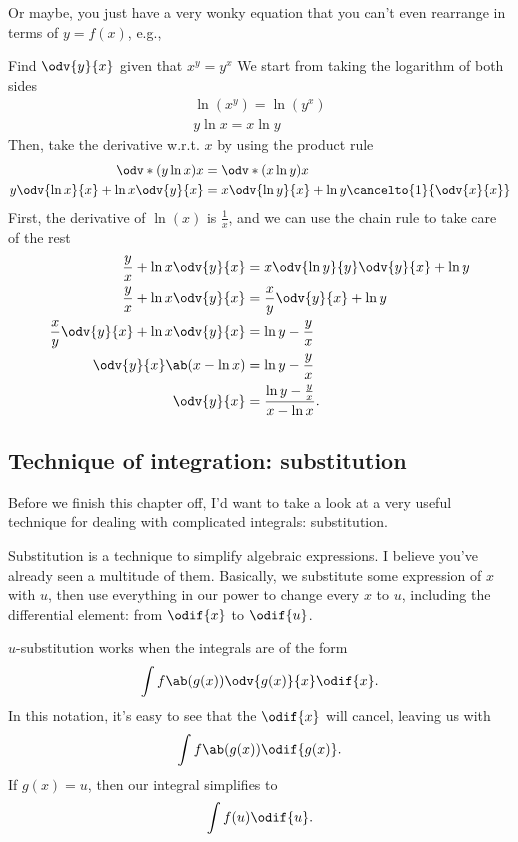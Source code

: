 Or maybe, you just have a very wonky equation that you can't even rearrange in terms of $y = f(x)$, e.g.,
\begin{exmp}{Find $\odv{y}{x}$ given that $x^y = y^x$}
	We start from taking the logarithm of both sides
	\begin{align}
		\ln(x^y) = \ln(y^x) \\
		y\ln x = x\ln y
	\end{align}
	Then, take the derivative w.r.t. $x$ by using the product rule
	\begin{align}
		\odv*{(y\ln x)}{x}                & = \odv*{(x\ln y)}{x}                              \\
		y\odv{\ln x}{x} + \ln x\odv{y}{x} & = x\odv{\ln y}{x} + \ln y\cancelto{1}{\odv{x}{x}}
	\end{align}
	First, the derivative of $\ln(x)$ is $\frac{1}{x}$, and we can use the chain rule to take care of the rest
	\begin{align}
		\frac{y}{x} + \ln x\odv{y}{x}           & = x\odv{\ln y}{y}\odv{y}{x} + \ln y       \\
		\frac{y}{x} + \ln x\odv{y}{x}           & = \frac{x}{y}\odv{y}{x} + \ln y           \\
		\frac{x}{y}\odv{y}{x} + \ln x\odv{y}{x} & = \ln y - \frac{y}{x}                     \\
		\odv{y}{x}\ab(x - \ln x)                & = \ln y - \frac{y}{x}                     \\
		\odv{y}{x}                              & = \frac{\ln y - \frac{y}{x}}{x - \ln x}.
	\end{align}
\end{exmp}


\subsection{Technique of integration: substitution}
\label{sec:u-substitution}

Before we finish this chapter off, I'd want to take a look at a very useful technique for dealing with complicated integrals: substitution.

Substitution is a technique to simplify algebraic expressions. I believe you've already seen a multitude of them. Basically, we substitute some expression of $x$ with $u$, then use everything in our power to change every $x$ to $u$, including the differential element: from $\odif{x}$ to $\odif{u}$.

$u$-substitution works when the integrals are of the form
\begin{equation}
	\int f\ab(g(x))\odv{g(x)}{x}\odif{x}.
\end{equation}
In this notation, it's easy to see that the $\odif{x}$ will cancel, leaving us with
\begin{equation}
	\int f\ab(g(x))\odif{g(x)}.
\end{equation}
If $g(x) = u$, then our integral simplifies to
\begin{equation}
	\int f(u)\odif{u}.
\end{equation}

